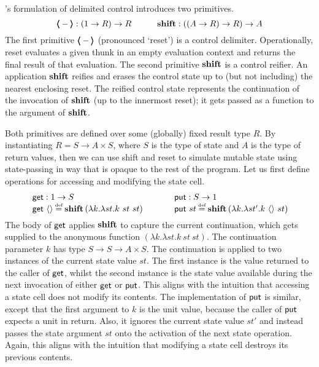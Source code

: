 \documentclass[12pt,phd,lfcs,twoside,openright,logo,leftchapter,normalheadings]{infthesis}
\theoremstyle{plain}
\theoremstyle{definition}
\begin{document}
\citeauthor{DanvyF89}'s formulation of delimited control introduces
two primitives.
%
\[
  \pmb{\langle} - \pmb{\rangle} : (1 \to R) \to R \qquad\quad
  \mathbf{shift} : ((A \to R) \to R) \to A
\]
%
The first primitive $\pmb{\langle} - \pmb{\rangle}$ (pronounced `reset') is a control
delimiter. Operationally, reset evaluates a given thunk in an empty
evaluation context and returns the final result of that evaluation.
%
The second primitive $\mathbf{shift}$ is a control reifier. An application
$\mathbf{shift}$ reifies and erases the control state up to (but not
including) the nearest enclosing reset. The reified control state
represents the continuation of the invocation of $\mathbf{shift}$ (up to the
innermost reset); it gets passed as a function to the argument of
$\mathbf{shift}$.

Both primitives are defined over some (globally) fixed result type
$R$.
%
By instantiating $R = S \to A \times S$, where $S$ is the type of
state and $A$ is the type of return values, then we can use shift and
reset to simulate mutable state using state-passing in way that is
opaque to the rest of the program.
%
Let us first define operations for accessing and modifying the state
cell.
%
\[
  \ba{@{~}l@{\qquad\quad}@{~}r}
  \multirow{2}{*}{
    \bl
      \getF : \UnitType \to S\\
      \getF~\Unit \defas \shift\,(\lambda k.\lambda st. k~st~st)
    \el} &
  \multirow{2}{*}{
    \bl
      \putF : S \to \UnitType\\
      \putF~st \defas \shift\,(\lambda k.\lambda st'.k~\Unit~st)
    \el} \\ & %
  \ea
\]
%
The body of $\mathsf{get}$ applies $\mathbf{shift}$ to capture the current
continuation, which gets supplied to the anonymous function
$(\lambda k.\lambda st. k~st~st)$. The continuation parameter $k$ has
type $S \to S \to A \times S$. The continuation is applied to two
instances of the current state value $st$. The first instance is the
value returned to the caller of $\mathsf{get}$, whilst the second instance is
the state value available during the next invocation of either $\mathsf{get}$
or $\mathsf{put}$. This aligns with the intuition that accessing a state cell
does not modify its contents. The implementation of $\mathsf{put}$ is
similar, except that the first argument to $k$ is the unit value,
because the caller of $\mathsf{put}$ expects a unit in return. Also, it
ignores the current state value $st'$ and instead passes the state
argument $st$ onto the activation of the next state operation. Again,
this aligns with the intuition that modifying a state cell destroys
its previous contents.
\end{document}
